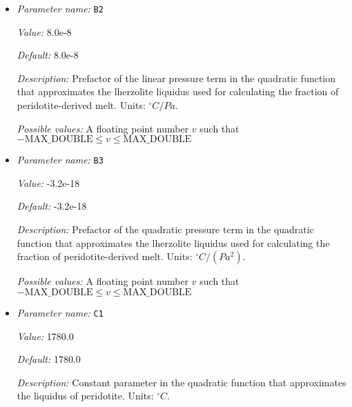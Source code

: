 \begin{itemize}
{\it Value:} 1475.0


{\it Default:} 1475.0


{\it Description:} Constant parameter in the quadratic function that approximates the lherzolite liquidus used for calculating the fraction of peridotite-derived melt. Units: ${}^\circ C$.


{\it Possible values:} A floating point number $v$ such that $-\text{MAX\_DOUBLE} \leq v \leq \text{MAX\_DOUBLE}$
\item {\it Parameter name:} {\tt B2}
\label{parameters:Material model/Melt simple/B2}


{\it Value:} 8.0e-8


{\it Default:} 8.0e-8


{\it Description:} Prefactor of the linear pressure term in the quadratic function that approximates the  lherzolite liquidus used for calculating the fraction of peridotite-derived melt. Units: ${}^\circ C/Pa$.


{\it Possible values:} A floating point number $v$ such that $-\text{MAX\_DOUBLE} \leq v \leq \text{MAX\_DOUBLE}$
\item {\it Parameter name:} {\tt B3}
\label{parameters:Material model/Melt simple/B3}


{\it Value:} -3.2e-18


{\it Default:} -3.2e-18


{\it Description:} Prefactor of the quadratic pressure term in the quadratic function that approximates the  lherzolite liquidus used for calculating the fraction of peridotite-derived melt. Units: ${}^\circ C/(Pa^2)$.


{\it Possible values:} A floating point number $v$ such that $-\text{MAX\_DOUBLE} \leq v \leq \text{MAX\_DOUBLE}$
\item {\it Parameter name:} {\tt C1}
\label{parameters:Material model/Melt simple/C1}


{\it Value:} 1780.0


{\it Default:} 1780.0


{\it Description:} Constant parameter in the quadratic function that approximates the liquidus of peridotite. Units: ${}^\circ C$.



\end{itemize}
